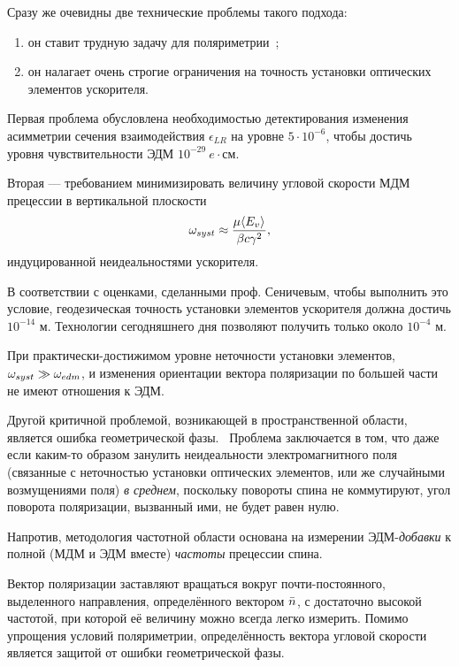 Сразу же очевидны две технические проблемы такого подхода:
\begin{enumerate}
	\item он ставит трудную задачу для поляриметрии~\cite[стр.~6]{Mane:SpinWheel};
	\item он налагает очень строгие ограничения на точность установки оптических элементов ускорителя.
\end{enumerate}

Первая проблема обусловлена необходимостью детектирования изменения асимметрии сечения 
взаимодействия $\epsilon_{LR}$ на уровне $5\cdot 10^{-6}$, чтобы достичь уровня чувствительности
ЭДМ $10^{-29}~e\cdot$см.~\cite[стр.~18]{BNL:Deuteron2008}

Вторая --- требованием минимизировать величину угловой скорости МДМ прецессии в 
вертикальной плоскости~\cite[стр.~11]{BNL:Deuteron2008}
\begin{equation}\label{eq:ImperfectionWheelRollRate}
	\w_{syst} \approx \frac{\mu\avg{E_v}}{\beta c\gamma^2},
\end{equation}
индуцированной неидеальностями ускорителя. 

В соответствии с оценками, сделанными проф. Сеничевым, чтобы выполнить это условие,
геодезическая точность установки элементов ускорителя должна достичь $10^{-14}$ м. 
Технологии сегодняшнего дня позволяют получить только около $10^{-4}$ м.

При практически-достижимом уровне неточности установки элементов, $\omega_{syst}\gg\omega_{edm}$,
и изменения ориентации вектора поляризации по большей части не имеют отношения к ЭДМ.

Другой критичной проблемой, возникающей в пространственной области, является ошибка
геометрической фазы.~\cite[стр.~6]{BNL:Proton}  Проблема заключается в том, что даже если
каким-то образом занулить неидеальности электромагнитного поля (связанные с неточностью
установки оптических элементов, или же случайными возмущениями поля) \emph{в среднем},
поскольку повороты спина не коммутируют, угол поворота поляризации, вызванный ими, не 
будет равен нулю.

Напротив, методология частотной области основана на измерении ЭДМ-\emph{добавки} к полной
(МДМ и ЭДМ вместе) \emph{частоты} прецессии спина.

Вектор поляризации заставляют вращаться вокруг почти-постоянного, выделенного направления,
определённого вектором $\bar n$, с достаточно высокой частотой, при которой её
величину можно всегда легко измерить. Помимо упрощения условий поляриметрии, определённость
вектора угловой скорости является защитой от ошибки геометрической фазы.

